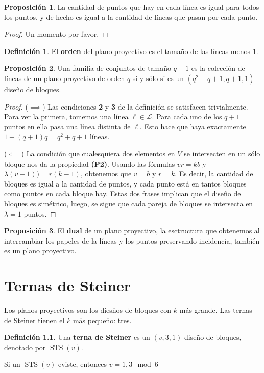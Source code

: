 \documentclass[spanish]{book}
\theoremstyle{definition}
\newtheorem*{defn}{Definición}
\newtheorem*{prop}{Proposición}
\DeclareMathOperator{\STS}{STS}
\begin{document}
\begin{prop}
	La cantidad de puntos que hay en cada línea es igual para todos los puntos, y de hecho es igual a la cantidad de líneas que pasan por cada punto.
\end{prop}
\begin{proof}
	Un momento por favor.
\end{proof}
\begin{defn}
	El \textbf{orden} del plano proyectivo es el tamaño de las líneas menos 1.
\end{defn}
\begin{prop}
	Una familia de conjuntos de tamaño $q+1$ es la colección de líneas de un plano proyectivo de orden $q$ si y sólo si es un $(q^2+q+1,q+1,1)$-diseño de bloques.
\end{prop}
\begin{proof}\leavevmode
	
	($\implies$) Las condiciones \textbf{2} y \textbf{3} de la definición se satisfacen trivialmente. Para ver la primera, tomemos una línea $\ell\in\mathcal{L}$. Para cada uno de los $q+1$ puntos en ella pasa una línea distinta de $\ell$. Esto hace que haya exactamente $1+(q+1)q=q^2+q+1$ líneas.
	
	($\impliedby$) La condición que cualesquiera dos elementos en $V$ se intersecten en un sólo bloque nos da la propiedad \textbf{(P2)}. Usando las fórmulas $vr=kb$ y $\lambda(v-1))=r(k-1)$, obtenemos que $v=b$ y $r=k$. Es decir, la cantidad de bloques es igual a la cantidad de puntos, y cada punto está en tantos bloques como puntos en cada bloque hay. Estas dos frases implican que el diseño de bloques es simétrico, luego, se sigue que cada pareja de bloques se intersecta en $\lambda=1$ puntos.
\end{proof}
\begin{prop}
	El \textbf{dual} de un plano proyectivo, la esctructura que obtenemos al intercambiar los papeles de la líneas y los puntos preservando incidencia, también es un plano proyectivo.
\end{prop}
\chapter{Ternas de Steiner}
Los planos proyectivos son los diesños de bloques con $k$ más grande. Las ternas de Steiner tienen el $k$ más pequeño: tres.
\begin{defn}
	Una \textbf{terna de Steiner} es un $(v,3,1)$-diseño de bloques, denotado por $\STS(v)$.
\end{defn}
\begin{teo}
	Si un $\STS(v)$ eviste, entonces $v=1,3\mod6$
\end{teo}
\end{document}
